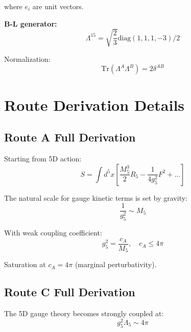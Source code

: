 \documentclass[11pt,a4paper]{article}
\theoremstyle{definition}
\begin{document}
where $e_i$ are unit vectors.

\textbf{B-L generator:}
\begin{equation}
\label{eq:gen-bl}
\Lambda^{15} = \sqrt{\frac{2}{3}} \text{diag}(1, 1, 1, -3) / 2
\end{equation}

Normalization:
\begin{equation}
\label{eq:gen-norm}
\text{Tr}(\Lambda^A \Lambda^B) = 2\delta^{AB}
\end{equation}

\section{Route Derivation Details}
\label{app:routes}

\subsection{Route A Full Derivation}
\label{subsec:route-a-full}

Starting from 5D action:
\begin{equation}
\label{eq:route-a-start}
S = \int d^5x \left[\frac{M_5^3}{2} R_5 - \frac{1}{4g_5^2} F^2 + \ldots\right]
\end{equation}

The natural scale for gauge kinetic terms is set by gravity:
\begin{equation}
\label{eq:route-a-natural}
\frac{1}{g_5^2} \sim M_5
\end{equation}

With weak coupling coefficient:
\begin{equation}
\label{eq:route-a-weak}
g_5^2 = \frac{c_A}{M_5}, \quad c_A \leq 4\pi
\end{equation}

Saturation at $c_A = 4\pi$ (marginal perturbativity).

\subsection{Route C Full Derivation}
\label{subsec:route-c-full}

The 5D gauge theory becomes strongly coupled at:
\begin{equation}
\label{eq:route-c-strong}
g_5^2 \Lambda_5 \sim 4\pi
\end{equation}
\end{document}
